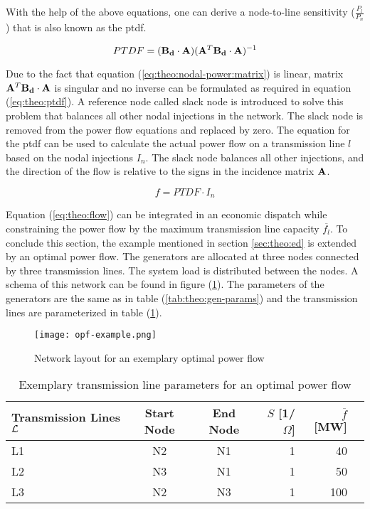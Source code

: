 With the help of the above equations, one can derive a node-to-line sensitivity ($\frac{P_l}{P_n}$) that is also known as the \gls{ptdf}.

\begin{equation}
	PTDF = (\vb{B_d} \cdot \vb{A})(\vb{A}^T \vb{B_d} \cdot \vb{A})^{-1} \label{eq:theo:ptdf}
\end{equation}

Due to the fact that equation (\ref{eq:theo:nodal-power:matrix}) is linear, matrix $\vb{A}^T \vb{B_d} \cdot \vb{A}$ is singular and no inverse can be formulated as required in equation (\ref{eq:theo:ptdf}). A reference node called slack node is introduced to solve this problem that balances all other nodal injections in the network. The slack node is removed from the power flow equations and replaced by zero. The equation for the \gls{ptdf} can be used to calculate the actual power flow on a transmission line $l$ based on the nodal injections $I_n$. The slack node balances all other injections, and the direction of the flow is relative to the signs in the incidence matrix $\vb{A}$.

\begin{equation}
	f = PTDF \cdot I_n \label{eq:theo:flow}
\end{equation}

Equation (\ref{eq:theo:flow}) can be integrated in an economic dispatch while constraining the power flow by the maximum transmission line capacity $\overline{f_l}$. To conclude this section, the example mentioned in section \ref{sec:theo:ed} is extended by an optimal power flow. The generators are allocated at three nodes connected by three transmission lines. The system load is distributed between the nodes. A schema of this network can be found in figure (\ref{fig:opf}). The parameters of the generators are the same as in table (\ref{tab:theo:gen-params}) and the transmission lines are parameterized in table (\ref{tab:theo:line-params}).

\begin{figure}[h]
	\centering
	\texttt{[image: opf-example.png]}
	\caption{Network layout for an exemplary optimal power flow}
	\label{fig:opf}
\end{figure}

\begin{table}[h!]
    \centering
    \begin{tabular}{lccrrc}
        Transmission Lines $\mathcal{L}$ & Start Node & End Node & $S$ [1/$\Omega$] & $\overline{f}$ [MW] \\ \toprule
        L1 & N2 & N1 & 1 & 40 \\
        L2 & N3 & N1 & 1 & 50 \\
        L3 & N2 & N3 & 1 & 100 \\
        \bottomrule
    \end{tabular}
    \caption{Exemplary transmission line parameters for an optimal power flow} \label{tab:theo:line-params}
\end{table}

